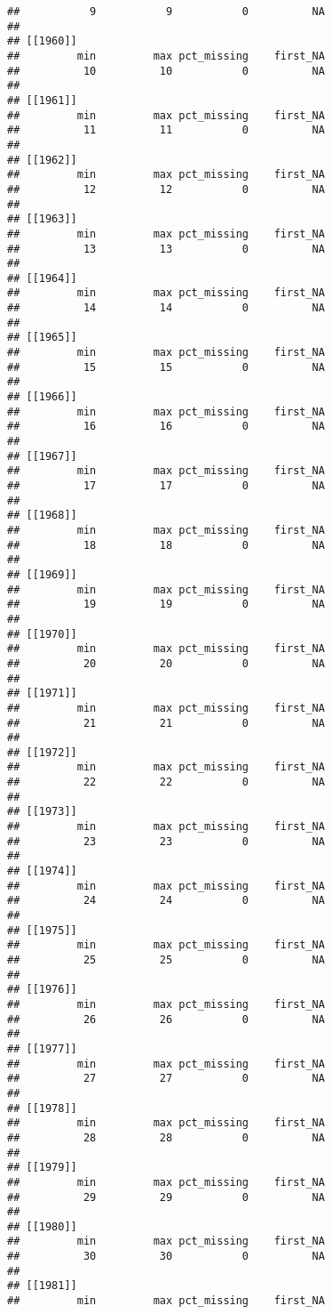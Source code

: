 \documentclass[
]{article}
\begin{document}
\begin{verbatim}
##           9           9           0          NA 
## 
## [[1960]]
##         min         max pct_missing    first_NA 
##          10          10           0          NA 
## 
## [[1961]]
##         min         max pct_missing    first_NA 
##          11          11           0          NA 
## 
## [[1962]]
##         min         max pct_missing    first_NA 
##          12          12           0          NA 
## 
## [[1963]]
##         min         max pct_missing    first_NA 
##          13          13           0          NA 
## 
## [[1964]]
##         min         max pct_missing    first_NA 
##          14          14           0          NA 
## 
## [[1965]]
##         min         max pct_missing    first_NA 
##          15          15           0          NA 
## 
## [[1966]]
##         min         max pct_missing    first_NA 
##          16          16           0          NA 
## 
## [[1967]]
##         min         max pct_missing    first_NA 
##          17          17           0          NA 
## 
## [[1968]]
##         min         max pct_missing    first_NA 
##          18          18           0          NA 
## 
## [[1969]]
##         min         max pct_missing    first_NA 
##          19          19           0          NA 
## 
## [[1970]]
##         min         max pct_missing    first_NA 
##          20          20           0          NA 
## 
## [[1971]]
##         min         max pct_missing    first_NA 
##          21          21           0          NA 
## 
## [[1972]]
##         min         max pct_missing    first_NA 
##          22          22           0          NA 
## 
## [[1973]]
##         min         max pct_missing    first_NA 
##          23          23           0          NA 
## 
## [[1974]]
##         min         max pct_missing    first_NA 
##          24          24           0          NA 
## 
## [[1975]]
##         min         max pct_missing    first_NA 
##          25          25           0          NA 
## 
## [[1976]]
##         min         max pct_missing    first_NA 
##          26          26           0          NA 
## 
## [[1977]]
##         min         max pct_missing    first_NA 
##          27          27           0          NA 
## 
## [[1978]]
##         min         max pct_missing    first_NA 
##          28          28           0          NA 
## 
## [[1979]]
##         min         max pct_missing    first_NA 
##          29          29           0          NA 
## 
## [[1980]]
##         min         max pct_missing    first_NA 
##          30          30           0          NA 
## 
## [[1981]]
##         min         max pct_missing    first_NA 

\end{verbatim}
\end{document}
